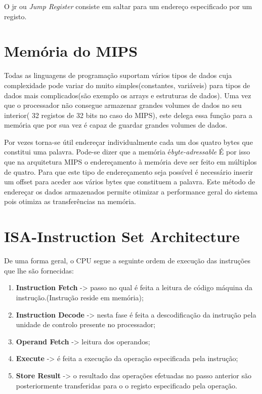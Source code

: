 \documentclass[10pt,a4paper]{book}
\begin{document}
 		O jr ou  \textit{Jump Register}  consiste em saltar para um endereço especificado por um registo.




 \chapter{Memória do MIPS}
    Todas as linguagens de programação suportam vários tipos de dados cuja complexidade pode variar do muito simples(constantes, variáveis) para tipos de dados mais complicados(são exemplo os arrays e estruturas de dados).
    Uma vez que o processador não consegue armazenar grandes volumes de dados no seu interior( 32 registos de 32 bits no caso do MIPS), este delega essa função para a memória que por sua vez é capaz de guardar grandes volumes de dados.

    Por vezes torna-se útil endereçar individualmente cada um dos quatro bytes que constitui uma palavra. Pode-se dizer que a memória é\textit{byte-adressable}
    É por isso que na arquitetura MIPS o endereçamento à memória deve ser feito em múltiplos de quatro.
    Para que este tipo de endereçamento seja possível é necessário inserir um offset para aceder aos vários bytes que constituem a palavra.
    Este método de endereçar os dados armazenados permite otimizar a performance geral do sistema pois otimiza as transferências na memória.


 \chapter{ISA-Instruction Set Architecture}

	De uma forma geral, o CPU segue a seguinte ordem de execução das instruções que lhe são fornecidas:
		\begin{enumerate}
			\item \textbf{Instruction Fetch} -> passo no qual é feita a leitura de código máquina da instrução.(Instrução reside em memória);
			\item \textbf{Instruction Decode} -> nesta fase é feita a descodificação da instrução pela unidade de controlo presente no processador;
			\item \textbf{Operand Fetch} -> leitura dos operandos;
			\item \textbf{Execute} -> é feita a execução da operação especificada pela instrução;
			\item \textbf{Store Result} -> o resultado das operações efetuadas no passo anterior são posteriormente transferidas para o o registo especificado pela operação.
		\end{enumerate}
\end{document}
